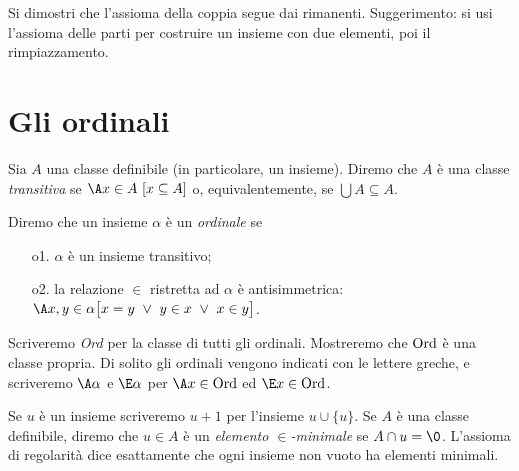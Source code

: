 \begin{exercise}
Si dimostri che l'assioma della coppia segue dai rimanenti. Suggerimento: si usi l'assioma delle parti per costruire un insieme con due elementi, poi il rimpiazzamento.
\end{exercise}


\section{Gli ordinali}
\def\ord{{\rm ord}}
\def\Ord{{\rm Ord}}
\def\lim{{\rm lim}}
\def\rel{{\rm rel}}
\def\fun{{\rm fun}}

Sia $A$ una classe definibile (in particolare, un insieme). Diremo che $A$ \`e una classe \emph{transitiva\/} se $\A x\in A\ [x\subseteq A]$ o, equivalentemente, se $\bigcup A\subseteq A$.

Diremo che un insieme $\alpha$ \`e un \emph{ordinale\/} se 
\begin{itemize}
\item[o1.] $\alpha$ \`e un insieme transitivo;
\item[o2.] la relazione $\in$ ristretta ad $\alpha$ \`e antisimmetrica: $\A x,y\in\alpha \big[x=y\ \vee\ y\in x\ \vee\ x\in y\big]$.
\end{itemize}
Scriveremo \emph{Ord\/} per la classe di tutti gli ordinali. Mostreremo che $\Ord$ \`e una classe propria. Di solito gli ordinali vengono indicati con le lettere greche, e scriveremo $\A\alpha$ e $\E\alpha$ per $\A x\in\Ord$ ed $\E x\in\Ord$. 

Se $u$ \`e un  insieme scriveremo \emph{$u+1$\/} per l'insieme $u\cup\{u\}$. Se $A$ \`e una classe definibile, diremo che $u\in A$ \`e un \emph{elemento $\in$-minimale} se $A\cap u=\0$. L'assioma di regolarit\`a dice esattamente che ogni insieme non vuoto ha elementi minimali. %

